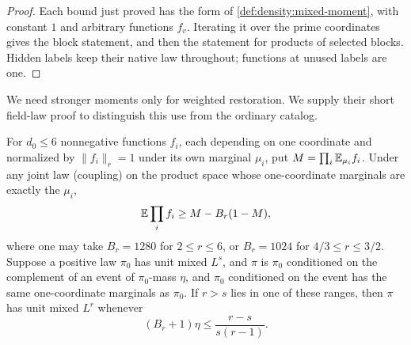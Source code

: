 \begin{proof}
Each bound just proved has the form of \cref{def:density:mixed-moment}, with constant $1$ and arbitrary functions $f_v$. Iterating it over
the prime coordinates gives the block statement, and then the statement
for products of selected blocks. Hidden labels keep their native law
throughout; functions at unused labels are one.
\end{proof}

We need stronger moments only for weighted restoration. We supply their
short field-law proof to distinguish this use from the ordinary catalog.

\begin{lemma}\label{lem:density:conditioning}
For $d_0\le6$ nonnegative functions $f_i$, each depending on
one coordinate and normalized by $\|f_i\|_r=1$ under its own
marginal $\mu_i$, put $M=\prod_i\mathbb E_{\mu_i} f_i$. Under any
joint law (coupling) on the product space whose one-coordinate
marginals are exactly the $\mu_i$,
\[
 \mathbb E\prod_i f_i\ge M-B_r(1-M),
\]
where one may take $B_r=1280$ for $2\le r\le6$, or $B_r=1024$ for
$4/3\le r\le3/2$. Suppose a positive law $\pi_0$ has unit mixed $L^s$,
and $\pi$ is $\pi_0$ conditioned on the complement of an event of $\pi_0$-mass $\eta$, and $\pi_0$ conditioned on the event has the same one-coordinate marginals as $\pi_0$. If $r>s$ lies
in one of these ranges, then $\pi$ has unit mixed $L^r$ whenever
\begin{equation}\label{eq:density:conditioning-gate}
 (B_r+1)\eta\le\frac{r-s}{s(r-1)}.
\end{equation}
\end{lemma}


